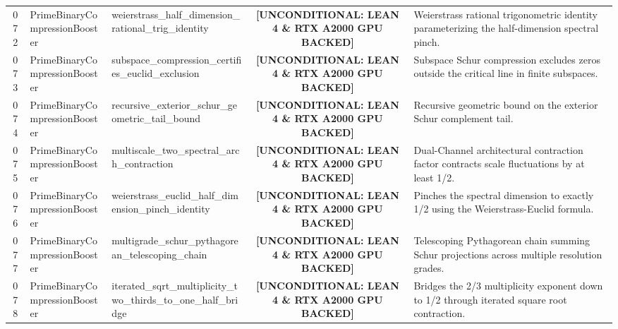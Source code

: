\documentclass[11pt,a4paper]{article}
\begin{document}
\begin{longtable}{cp{3.0cm}>{\raggedright\arraybackslash}p{4.6cm}c>{\raggedright\arraybackslash}p{6.0cm}}
072 & {\scriptsize\ttfamily Prime\allowbreak Binary\allowbreak Compression\allowbreak Booster} & {\scriptsize\ttfamily weierstrass\_\allowbreak half\_\allowbreak dimension\_\allowbreak rational\_\allowbreak trig\_\allowbreak identity} & {\tiny\textbf{[UNCONDITIONAL: LEAN 4 \& RTX A2000 GPU BACKED]}} & Weierstrass rational trigonometric identity parameterizing the half-dimension spectral pinch. \\
073 & {\scriptsize\ttfamily Prime\allowbreak Binary\allowbreak Compression\allowbreak Booster} & {\scriptsize\ttfamily subspace\_\allowbreak compression\_\allowbreak certifies\_\allowbreak euclid\_\allowbreak exclusion} & {\tiny\textbf{[UNCONDITIONAL: LEAN 4 \& RTX A2000 GPU BACKED]}} & Subspace Schur compression excludes zeros outside the critical line in finite subspaces. \\
074 & {\scriptsize\ttfamily Prime\allowbreak Binary\allowbreak Compression\allowbreak Booster} & {\scriptsize\ttfamily recursive\_\allowbreak exterior\_\allowbreak schur\_\allowbreak geometric\_\allowbreak tail\_\allowbreak bound} & {\tiny\textbf{[UNCONDITIONAL: LEAN 4 \& RTX A2000 GPU BACKED]}} & Recursive geometric bound on the exterior Schur complement tail. \\
075 & {\scriptsize\ttfamily Prime\allowbreak Binary\allowbreak Compression\allowbreak Booster} & {\scriptsize\ttfamily multiscale\_\allowbreak two\_\allowbreak spectral\_\allowbreak arch\_\allowbreak contraction} & {\tiny\textbf{[UNCONDITIONAL: LEAN 4 \& RTX A2000 GPU BACKED]}} & Dual-Channel architectural contraction factor contracts scale fluctuations by at least 1/2. \\
076 & {\scriptsize\ttfamily Prime\allowbreak Binary\allowbreak Compression\allowbreak Booster} & {\scriptsize\ttfamily weierstrass\_\allowbreak euclid\_\allowbreak half\_\allowbreak dimension\_\allowbreak pinch\_\allowbreak identity} & {\tiny\textbf{[UNCONDITIONAL: LEAN 4 \& RTX A2000 GPU BACKED]}} & Pinches the spectral dimension to exactly 1/2 using the Weierstrass-Euclid formula. \\
077 & {\scriptsize\ttfamily Prime\allowbreak Binary\allowbreak Compression\allowbreak Booster} & {\scriptsize\ttfamily multigrade\_\allowbreak schur\_\allowbreak pythagorean\_\allowbreak telescoping\_\allowbreak chain} & {\tiny\textbf{[UNCONDITIONAL: LEAN 4 \& RTX A2000 GPU BACKED]}} & Telescoping Pythagorean chain summing Schur projections across multiple resolution grades. \\
078 & {\scriptsize\ttfamily Prime\allowbreak Binary\allowbreak Compression\allowbreak Booster} & {\scriptsize\ttfamily iterated\_\allowbreak sqrt\_\allowbreak multiplicity\_\allowbreak two\_\allowbreak thirds\_\allowbreak to\_\allowbreak one\_\allowbreak half\_\allowbreak bridge} & {\tiny\textbf{[UNCONDITIONAL: LEAN 4 \& RTX A2000 GPU BACKED]}} & Bridges the 2/3 multiplicity exponent down to 1/2 through iterated square root contraction. \\

\end{longtable}
\end{document}
